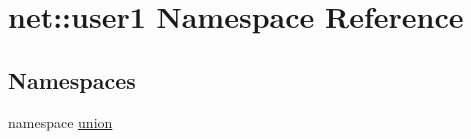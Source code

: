 \hypertarget{namespacenet_1_1user1}{\section{net\-:\-:user1 \-Namespace \-Reference}
\label{namespacenet_1_1user1}
}
\subsection*{\-Namespaces}
\begin{DoxyCompactItemize}
\item 
namespace \hyperlink{namespacenet_1_1user1_1_1union}{union}
\end{DoxyCompactItemize}
